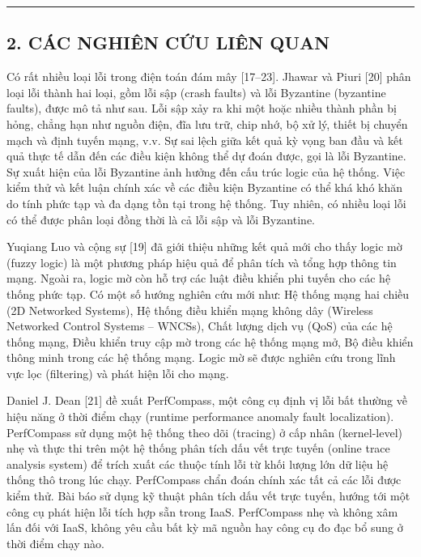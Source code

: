 \documentclass[
  vietnamese,
]{article}
\begin{document}
\begin{center}\rule{0.5\linewidth}{0.5pt}\end{center}

\subsection{2. CÁC NGHIÊN CỨU LIÊN
QUAN}\label{cuxe1c-nghiuxean-cux1ee9u-liuxean-quan}

Có rất nhiều loại lỗi trong điện toán đám mây {[}17--23{]}. Jhawar và
Piuri {[}20{]} phân loại lỗi thành hai loại, gồm lỗi sập (crash faults)
và lỗi Byzantine (byzantine faults), được mô tả như sau. Lỗi sập xảy ra
khi một hoặc nhiều thành phần bị hỏng, chẳng hạn như nguồn điện, đĩa lưu
trữ, chip nhớ, bộ xử lý, thiết bị chuyển mạch và định tuyến mạng, v.v.
Sự sai lệch giữa kết quả kỳ vọng ban đầu và kết quả thực tế dẫn đến các
điều kiện không thể dự đoán được, gọi là lỗi Byzantine. Sự xuất hiện của
lỗi Byzantine ảnh hưởng đến cấu trúc logic của hệ thống. Việc kiểm thử
và kết luận chính xác về các điều kiện Byzantine có thể khá khó khăn do
tính phức tạp và đa dạng tồn tại trong hệ thống. Tuy nhiên, có nhiều
loại lỗi có thể được phân loại đồng thời là cả lỗi sập và lỗi Byzantine.

Yuqiang Luo và cộng sự {[}19{]} đã giới thiệu những kết quả mới cho thấy
logic mờ (fuzzy logic) là một phương pháp hiệu quả để phân tích và tổng
hợp thông tin mạng. Ngoài ra, logic mờ còn hỗ trợ các luật điều khiển
phi tuyến cho các hệ thống phức tạp. Có một số hướng nghiên cứu mới như:
Hệ thống mạng hai chiều (2D Networked Systems), Hệ thống điều khiển mạng
không dây (Wireless Networked Control Systems -- WNCSs), Chất lượng dịch
vụ (QoS) của các hệ thống mạng, Điều khiển truy cập mờ trong các hệ
thống mạng mở, Bộ điều khiển thông minh trong các hệ thống mạng. Logic
mờ sẽ được nghiên cứu trong lĩnh vực lọc (filtering) và phát hiện lỗi
cho mạng.

Daniel J. Dean {[}21{]} đề xuất PerfCompass, một công cụ định vị lỗi
bất thường về hiệu năng ở thời điểm chạy (runtime performance anomaly
fault localization). PerfCompass sử dụng một hệ thống theo dõi (tracing)
ở cấp nhân (kernel-level) nhẹ và thực thi trên một hệ thống phân tích
dấu vết trực tuyến (online trace analysis system) để trích xuất các
thuộc tính lỗi từ khối lượng lớn dữ liệu hệ thống thô trong lúc chạy.
PerfCompass chẩn đoán chính xác tất cả các lỗi được kiểm thử. Bài báo sử
dụng kỹ thuật phân tích dấu vết trực tuyến, hướng tới một công cụ phát
hiện lỗi tích hợp sẵn trong IaaS. PerfCompass nhẹ và không xâm lấn đối
với IaaS, không yêu cầu bất kỳ mã nguồn hay công cụ đo đạc bổ sung ở
thời điểm chạy nào.
\end{document}
